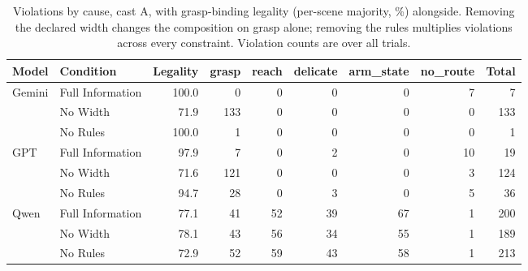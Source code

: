 \begin{table}[H]
  \centering
  \caption{Violations by cause, cast A, with grasp-binding legality (per-scene majority, \%) alongside. Removing the declared width changes the composition on grasp alone; removing the rules multiplies violations across every constraint. Violation counts are over all trials.}
  \label{tab:ex1:composition}
  \small
  \begin{tabular}{llrrrrrrr}
    \toprule
    Model & Condition & Legality & grasp & reach & delicate & arm\_state & no\_route & Total \\
    \midrule
    Gemini & Full Information & 100.0 & 0 & 0 & 0 & 0 & 7 & 7 \\
     & No Width & 71.9 & 133 & 0 & 0 & 0 & 0 & 133 \\
     & No Rules & 100.0 & 1 & 0 & 0 & 0 & 0 & 1 \\
    GPT & Full Information & 97.9 & 7 & 0 & 2 & 0 & 10 & 19 \\
     & No Width & 71.6 & 121 & 0 & 0 & 0 & 3 & 124 \\
     & No Rules & 94.7 & 28 & 0 & 3 & 0 & 5 & 36 \\
    Qwen & Full Information & 77.1 & 41 & 52 & 39 & 67 & 1 & 200 \\
     & No Width & 78.1 & 43 & 56 & 34 & 55 & 1 & 189 \\
     & No Rules & 72.9 & 52 & 59 & 43 & 58 & 1 & 213 \\
    \bottomrule
  \end{tabular}
\end{table}
